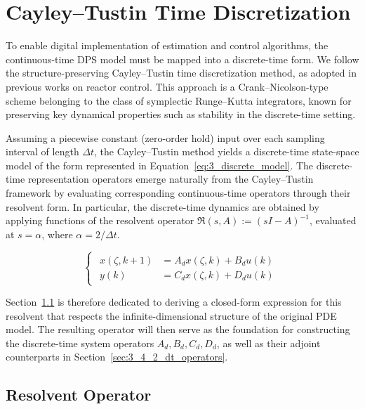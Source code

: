 \section{Cayley--Tustin Time Discretization} \label{sec:3_4_dt}

To enable digital implementation of estimation and control algorithms, the continuous-time DPS model must be mapped into a discrete-time form. We follow the structure-preserving Cayley--Tustin time discretization method, as adopted in previous works on reactor control\autocite{Khatibi2021Model, Moadeli2025Model,Moadeli2025Observer}. This approach is a Crank--Nicolson-type scheme belonging to the class of symplectic Runge--Kutta integrators, known for preserving key dynamical properties such as stability in the discrete-time setting\autocite{havu2007cayley, hairer2006geometric}.

Assuming a piecewise constant (zero-order hold) input over each sampling interval of length $\Delta t$, the Cayley--Tustin method yields a discrete-time state-space model of the form represented in Equation~\eqref{eq:3_discrete_model}. The discrete-time representation operators emerge naturally from the Cayley--Tustin framework by evaluating corresponding continuous-time operators through their resolvent form. In particular, the discrete-time dynamics are obtained by applying functions of the resolvent operator $\mathfrak{R}(s, A) := (sI - A)^{-1}$, evaluated at $s = \alpha$, where $\alpha = 2 / \Delta t$.

\begin{equation} \label{eq:3_discrete_model}
    \begin{cases}
        \begin{aligned}
        x(\zeta, k{+}1) &= A_d x(\zeta, k) + B_d u(k)\\
        y(k) & = C_d x(\zeta, k) + D_d u(k)
        \end{aligned}
    \end{cases}
\end{equation}

Section~\ref{sec:3_4_1_resolvent} is therefore dedicated to deriving a closed-form expression for this resolvent that respects the infinite-dimensional structure of the original PDE model. The resulting operator will then serve as the foundation for constructing the discrete-time system operators $A_d, B_d, C_d, D_d$, as well as their adjoint counterparts in Section~\ref{sec:3_4_2_dt_operators}.


\subsection{Resolvent Operator} \label{sec:3_4_1_resolvent}

